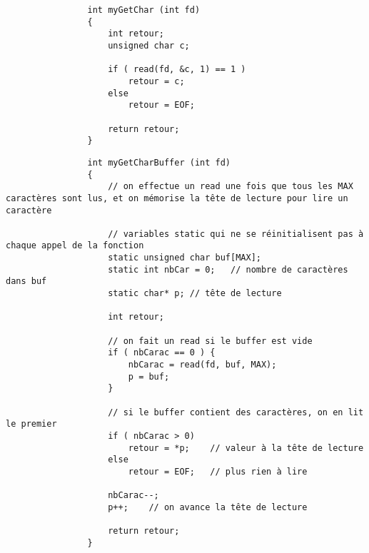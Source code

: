 			\begin{lstlisting}
				int myGetChar (int fd) 
				{
					int retour;
					unsigned char c;
					
					if ( read(fd, &c, 1) == 1 )
						retour = c;
					else
						retour = EOF;
						
					return retour;
				}
			\end{lstlisting}
			
						
			\begin{lstlisting}
				int myGetCharBuffer (int fd) 
				{
					// on effectue un read une fois que tous les MAX caractères sont lus, et on mémorise la tête de lecture pour lire un caractère  
					
					// variables static qui ne se réinitialisent pas à chaque appel de la fonction
					static unsigned char buf[MAX];
					static int nbCar = 0;	// nombre de caractères dans buf
					static char* p;	// tête de lecture
					
					int retour; 
					
					// on fait un read si le buffer est vide
					if ( nbCarac == 0 ) {
						nbCarac = read(fd, buf, MAX);
						p = buf;
					}
					
					// si le buffer contient des caractères, on en lit le premier
					if ( nbCarac > 0)
						retour = *p;	// valeur à la tête de lecture
					else 
						retour = EOF;	// plus rien à lire
						
					nbCarac--;
					p++;	// on avance la tête de lecture
						
					return retour;
				}
			\end{lstlisting}
		
		
		
		
		
		
		
		
	